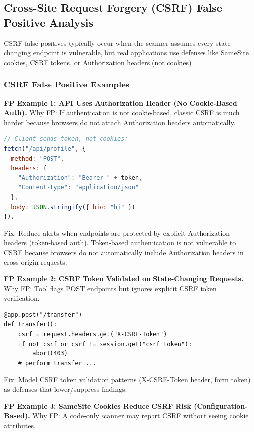 \subsection{Cross-Site Request Forgery (CSRF) False Positive Analysis}
\label{sec:fp_csrf}

CSRF false positives typically occur when the scanner assumes every state-changing endpoint is vulnerable, but real applications use defenses like SameSite cookies, CSRF tokens, or Authorization headers (not cookies)~\cite{MDNSameSite,RFC6265,OWASPCSRCheatsheet}.

\subsubsection{CSRF False Positive Examples}
\label{sec:fp_csrf_examples}

\textbf{FP Example 1: API Uses Authorization Header (No Cookie-Based Auth).} Why FP: If authentication is not cookie-based, classic CSRF is much harder because browsers do not attach Authorization headers automatically.

\begin{lstlisting}[language=JavaScript, basicstyle=\ttfamily\small, keywordstyle=\color{blue}, stringstyle=\color{orange!80!black}, frame=single, breaklines=true, breakatwhitespace=false]
// Client sends token, not cookies:
fetch("/api/profile", {
  method: "POST",
  headers: {
    "Authorization": "Bearer " + token,
    "Content-Type": "application/json"
  },
  body: JSON.stringify({ bio: "hi" })
});
\end{lstlisting}
Fix: Reduce alerts when endpoints are protected by explicit Authorization headers (token-based auth). Token-based authentication is not vulnerable to CSRF because browsers do not automatically include Authorization headers in cross-origin requests.

\textbf{FP Example 2: CSRF Token Validated on State-Changing Requests.} Why FP: Tool flags POST endpoints but ignores explicit CSRF token verification.

\begin{lstlisting}[style=pycode]
@app.post("/transfer")
def transfer():
    csrf = request.headers.get("X-CSRF-Token")
    if not csrf or csrf != session.get("csrf_token"):
        abort(403)
    # perform transfer ...
\end{lstlisting}
Fix: Model CSRF token validation patterns (X-CSRF-Token header, form token) as defenses that lower/suppress findings.

\textbf{FP Example 3: SameSite Cookies Reduce CSRF Risk (Configuration-Based).} Why FP: A code-only scanner may report CSRF without seeing cookie attributes.

